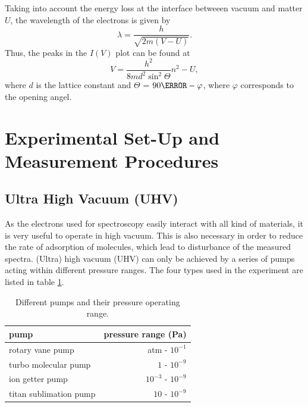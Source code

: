 \documentclass[a4paper]{scrartcl}
\numberwithin{equation}{section}
\numberwithin{figure}{section}
\numberwithin{table}{section}
\newcommand{\eq}[2]{\begin{equation}#1\label{#2}\end{equation}}
\begin{document}
Taking into account the energy loss at the interface betweeen vacuum and matter $U$, the wavelength of the electrons is given by
\eq{\lambda = \frac{h}{\sqrt{2m(V-U)}}.}{lshift}
Thus, the peaks in the $I(V)$ plot can be found at
\eq{V=\frac{h^2}{8md^2 \sin^2 \Theta }n^2-U,}{eq:iv}
where $d$ is the lattice constant and $\Theta$ = $90\degree - \varphi$, where $\varphi$ corresponds to the opening angel. 

\clearpage
\section{Experimental Set-Up and Measurement Procedures}
\FloatBarrier
\subsection{Ultra High Vacuum (UHV)}
As the electrons used for spectroscopy easily interact with all kind of materials, it is very useful to operate in high vacuum. This is also necessary in order to reduce the rate of adsorption of molecules, which lead to disturbance of the measured spectra. (Ultra) high  vacuum (UHV) can only be achieved by a series of pumps acting within different pressure ranges. The four types used in the experiment are listed in table \ref{tab:pump}.
\begin{table}
\begin{tabular}{lr}
\toprule
pump & pressure range (Pa)\\
\midrule
\small rotary vane pump & atm - $10^{-1}$  \\ %
\small turbo molecular pump &  $1$  - $10^{-9}$  \\
\small ion getter pump  & $ 10^{-3}$  - $10^{-9}$  \\
\small titan sublimation pump & $10$  - $10^{-9}$  \\
\bottomrule
\end{tabular}
\caption{Different pumps and their pressure operating range.}
\label{tab:pump}
\end{table}
\end{document}

